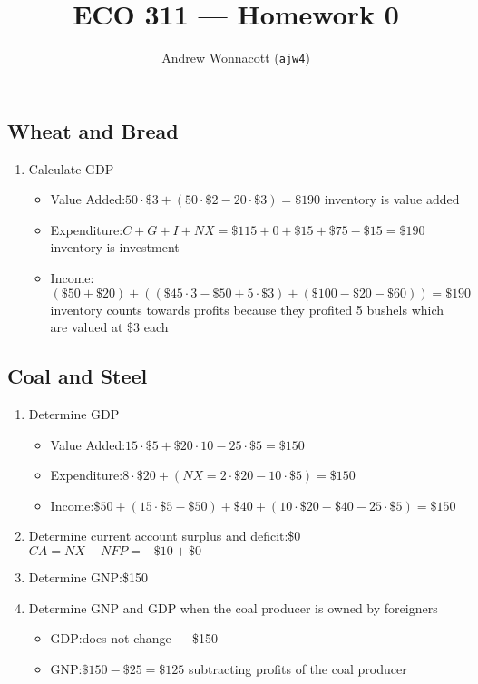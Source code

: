 \documentclass{pset}
\title{ECO 311 --- Homework 0}
\author{Andrew Wonnacott (\texttt{ajw4})}
\begin{document}
\maketitle
\subsection{Wheat and Bread}
\begin{enumerate}
  \item Calculate GDP
    \begin{itemize}
    \item Value Added:\@ \( 50\cdot\$3 + (50\cdot\$2 - 20\cdot\$3) = \$190 \)
      {\color{red} inventory is value added}
    \item Expenditure:\@ \( C + G + I + NX = \$115 + 0 + \$15 + \$75 - \$15 = \$190 \)
      {\color{red} inventory is investment}
    \item Income:\@ \( (\$50 + \$20) + ((\$45 \cdot 3 - \$50 + 5 \cdot \$3) + (\$100 - \$20 - \$60)) = \$190 \)
      \\{\color{red} inventory counts towards profits because they profited 5 bushels which are valued at \$3 each}
    \end{itemize}
  \end{enumerate}
\subsection{Coal and Steel}
\begin{enumerate}
\item Determine GDP
  \begin{itemize}
    \item Value Added:\@ \( 15 \cdot \$5 + \$20 \cdot 10-25 \cdot \$5= \$150 \)
    \item Expenditure:\@ \( 8 \cdot \$20 + (NX = 2 \cdot \$20 - 10 \cdot \$5) = \$150 \)
    \item Income:\@ \( \$50 + (15 \cdot \$5 - \$50) + \$40 + (10 \cdot \$20 - \$40 - 25 \cdot \$5) = \$150\)
    \end{itemize}
  \item Determine current account surplus and deficit:\@ \$0
    \\{\color{red} \( CA = NX + NFP = -\$10 + \$0\)}
  \item Determine GNP:\@ \$150
  \item Determine GNP and GDP when the coal producer is owned by foreigners
    \begin{itemize}
    \item GDP:\@ does not change --- \$150
    \item GNP:\@ \( \$150 - \$25 = \$125 \) subtracting profits of the coal producer
    \end{itemize}
\end{enumerate}
\end{document}
